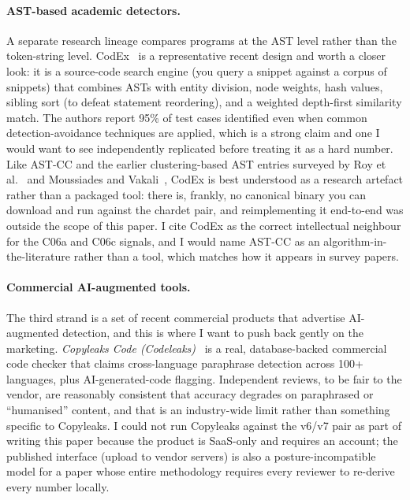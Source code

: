\documentclass[11pt,letterpaper]{article}
\begin{document}
\paragraph{AST-based academic detectors.}
A separate research lineage compares programs at the AST level rather
than the token-string level. CodEx~\cite{zheng2018codex} is a
representative recent design and worth a closer look: it is a
source-code search engine (you query a snippet against a corpus of
snippets) that combines ASTs with entity division, node weights, hash
values, sibling sort (to defeat statement reordering), and a weighted
depth-first similarity match. The authors report 95\% of test cases
identified even when common detection-avoidance techniques are
applied, which is a strong claim and one I would want to see
independently replicated before treating it as a hard number. Like
AST-CC and the earlier clustering-based AST entries surveyed by Roy
et al.~\cite{roy2009comparison} and
Moussiades and Vakali~\cite{moussiades2005astcc}, CodEx is best
understood as a research artefact rather than a packaged tool: there
is, frankly, no canonical binary you can download and run against
the chardet pair, and reimplementing it end-to-end was outside the
scope of this paper. I cite CodEx as the correct intellectual
neighbour for the C06a and C06c signals, and I would name AST-CC as
an algorithm-in-the-literature rather than a tool, which matches how
it appears in survey papers.

\paragraph{Commercial AI-augmented tools.}
The third strand is a set of recent commercial products that
advertise AI-augmented detection, and this is where I want to push
back gently on the marketing.
\emph{Copyleaks Code (Codeleaks)}~\cite{copyleaks2026code} is a
real, database-backed commercial code checker that claims
cross-language paraphrase detection across 100+ languages, plus
AI-generated-code flagging. Independent reviews, to be fair to the
vendor, are reasonably consistent that accuracy degrades on
paraphrased or ``humanised'' content, and that is an industry-wide
limit rather than something specific to Copyleaks. I could not run
Copyleaks against the v6/v7 pair as part of writing this paper
because the product is SaaS-only and requires an account; the
published interface (upload to vendor servers) is also a
posture-incompatible model for a paper whose entire methodology
requires every reviewer to re-derive every number locally.
\end{document}
